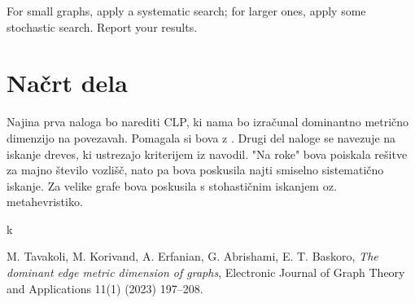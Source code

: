 \documentclass[a4paper,12pt]{article}
\begin{document}
    For small graphs, apply a systematic search; for larger ones, apply some stochastic search. Report your results.

\section{Načrt dela}
    Najina prva naloga bo narediti CLP, ki nama bo izračunal dominantno metrično dimenzijo na povezavah. Pomagala si bova z \cite{dominantedge}. Drugi del naloge se navezuje na iskanje dreves, ki ustrezajo kriterijem iz navodil. "Na roke" bova poiskala rešitve za majno število vozlišč, nato pa bova poskusila najti smiselno sistematično iskanje. Za velike grafe bova poskusila s stohastičnim iskanjem oz. metahevristiko.

    k 


    \begin{thebibliography}{99}
        M. Tavakoli, M. Korivand, A. Erfanian, G. Abrishami, E. T. Baskoro,
        \emph{The dominant edge metric dimension of graphs},
        Electronic Journal of Graph Theory and Applications 11(1) (2023) 197–208.  
    \end{thebibliography}
\end{document}
